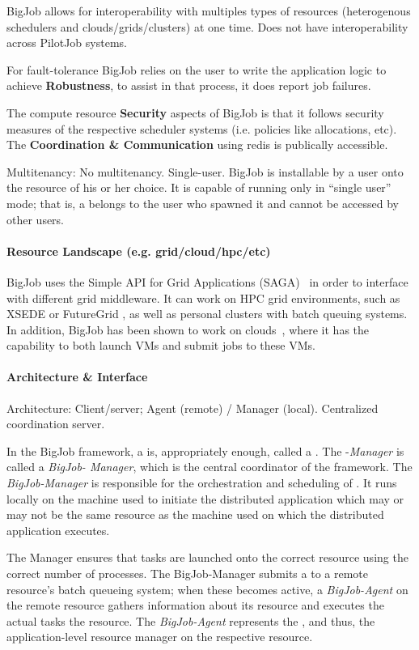 \documentclass{sig-alternate}
\begin{document}
BigJob allows for interoperability with multiples types of resources
(heterogenous schedulers and clouds/grids/clusters) at one time.
Does not have interoperability across PilotJob systems.

For fault-tolerance BigJob relies on the user to write the application logic to
achieve \textbf{Robustness}, to assist in that process, it does report job
failures.

The compute resource \textbf{Security} aspects of BigJob is that it follows
security measures of the respective scheduler systems (i.e. policies like
allocations, etc).
The \textbf{Coordination \& Communication} using redis is publically
accessible.

Multitenancy: No multitenancy. Single-user.
BigJob is installable by a user onto the resource of his or her choice. It is capable of
running only in ``single user'' mode; that is, a \pilot belongs to the user who
spawned it and cannot be accessed by other users.

\paragraph{Resource Landscape (e.g. grid/cloud/hpc/etc)}
BigJob uses the Simple API for Grid Applications (SAGA)~\cite{ogf-gfd-90, sagastuff}
in order to interface with different grid middleware. It can work on HPC grid
environments, such as XSEDE or FutureGrid , as well as personal
clusters with batch queuing systems. In addition, BigJob has been shown to work
on clouds~\cite{cpe_pmr_cloud_2012}, where it has the capability to both
launch VMs and submit jobs to these VMs.

\paragraph{Architecture \& Interface}
Architecture: Client/server; Agent (remote) / Manager (local). Centralized coordination server.

In the BigJob framework, a \pilot is, appropriately enough, called a
\pilot. The \pilot-\textit{Manager} is called a \textit{BigJob-
Manager}, which is the central coordinator of the
framework. The \textit{BigJob-Manager} is responsible for
the orchestration and scheduling of \pilots. It runs locally on the
machine used to initiate the distributed application which may or may
not be the same resource as the machine used on which the distributed
application executes.

The Manager ensures that tasks are launched onto the correct resource
using the correct number of processes. The BigJob-Manager submits a
\pilot to a remote resource's batch queueing system; when these
\pilots becomes active, a \textit{BigJob-Agent} on the remote resource
gathers information about its resource
and executes the actual tasks the resource. The \textit{BigJob-Agent}
represents the \pilotjob, and thus, the application-level resource
manager on the respective resource.
\end{document}

